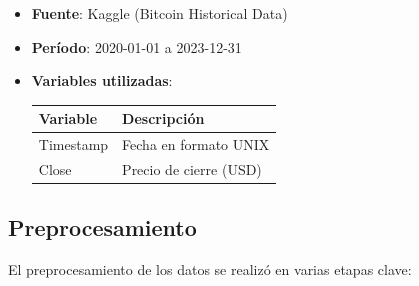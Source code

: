 \documentclass[12pt]{article}
\begin{document}
\begin{itemize}
\item \textbf{Fuente}: Kaggle (Bitcoin Historical Data)
\item \textbf{Período}: 2020-01-01 a 2023-12-31 
\item \textbf{Variables utilizadas}:
\begin{table}[H]
\centering
\begin{tabular}{ll}
\toprule
\textbf{Variable} & \textbf{Descripción} \\
\midrule
Timestamp & Fecha en formato UNIX \\
Close & Precio de cierre (USD) \\
\bottomrule
\end{tabular}
\end{table}
\end{itemize}


\bigskip
\subsection{Preprocesamiento}

El preprocesamiento de los datos se realizó en varias etapas clave:
\end{document}
